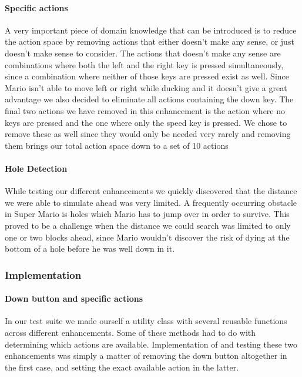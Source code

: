\documentclass[10pt,a4paper]{article}
\begin{document}
\paragraph{Specific actions}
A very important piece of domain knowledge that can be introduced is to reduce the action space by removing actions that either doesn't make any sense, or just doesn't make sense to consider.
The actions that doesn't make any sense are combinations where both the left and the right key is pressed simultaneously, since a combination where neither of those keys are pressed exist as well.
Since Mario isn't able to move left or right while ducking and it doesn't give a great advantage we also decided to eliminate all actions containing the down key.
The final two actions we have removed in this enhancement is the action where no keys are pressed and the one where only the speed key is pressed. We chose to remove these as well since they would only be needed very rarely and removing them brings our total action space down to a set of 10 actions

\paragraph{Hole Detection}
\label{hole}
While testing our different enhancements we quickly discovered that the distance we were able to simulate ahead was very limited. A frequently occurring obstacle in Super Mario is holes which Mario has to jump over in order to survive. This proved to be a challenge when the distance we could search was limited to only one or two blocks ahead, since Mario wouldn't discover the risk of dying at the bottom of a hole before he was well down in it.


\subsubsection{Implementation}

\paragraph{Down button and specific actions}
In our test suite we made ourself a utility class with several reusable functions across different enhancements. Some of these methods had to do with determining which actions are available. Implementation of and testing these two enhancements was simply a matter of removing the down button altogether in the first case, and setting the exact available action in the latter.
\end{document}
